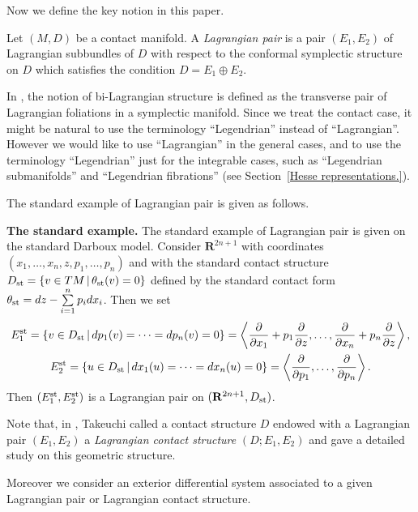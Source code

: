 Now we def\/ine the key notion in this paper.

\begin{Def}
Let $(M, D)$ be a contact manifold.
A {\it Lagrangian pair} is a pair $(E_1, E_2)$
of Lagrangian subbundles of $D$ with respect to the conformal symplectic structure
on $D$ which satisf\/ies the condition $D = E_1 \oplus E_2$.
\end{Def}

\begin{Rem}
In \cite[\S~5.2]{B}, the notion of bi-Lagrangian structure is def\/ined as the transverse pair of Lagrangian foliations in a symplectic manifold.
Since we treat the contact case, it might be natural to use
the terminology  ``Legendrian'' instead of ``Lagrangian''.
However we would like to use ``Lagrangian'' in the general cases, and
to use the terminology ``Legendrian'' just for the integrable cases, such as ``Legendrian submanifolds'' and
``Legendrian f\/ibrations'' (see Section~\ref{Hesse representations.}).
\end{Rem}

The standard example of Lagrangian pair is given as follows.

{\bf The standard example.}
The standard example of Lagrangian pair is given on
the standard Darboux model.
Consider ${\mathbf{R}}^{2n+1}$ with coordinates
$(x_1,\dots,x_n,z,p_1,\dots,p_n)$ and with the standard
contact structure
$D_{\rm{st}} = \{ v \in TM \,|\, \theta_{\rm{st}}(v) = 0\}$ def\/ined by
the standard contact form
$\theta_{\rm{st}} = dz - \sum\limits_{i=1}^np_idx_i$.
Then we set
\begin{gather*}
E^{\rm{st}}_1   =
\{ v \in D_{\rm{st}} \,|\,
dp_1(v) = \cdots = dp_n(v) = 0 \} = \left\langle \frac{\partial}{\partial x_1} +
p_1\frac{\partial}{\partial z},
\dots, \frac{\partial}{\partial x_n} + p_n\frac{\partial}{\partial z}\right\rangle,
\\
E^{\rm{st}}_2  =
\{ u \in D_{\rm{st}} \,|\,
dx_1(u) = \cdots = dx_n(u) = 0\} =
\left\langle \frac{\partial}{\partial p_1},
\dots, \frac{\partial}{\partial p_n}\right\rangle.
\end{gather*}
Then $(E^{\rm{st}}_1, E^{\rm{st}}_2)$ is a Lagrangian pair on
$({\mathbf{R}}^{2n+1}, D_{\rm{st}})$.


Note that,
in \cite{Tak}, Takeuchi called
a contact structure $D$ endowed with a Lagrangian pair $(E_1,E_2)$
a {\it Lagrangian contact structure} $(D; E_1,E_2)$ and
gave a detailed study on this geometric structure.

Moreover we consider an exterior dif\/ferential system associated to a given
Lagrangian pair or Lagrangian contact structure.

